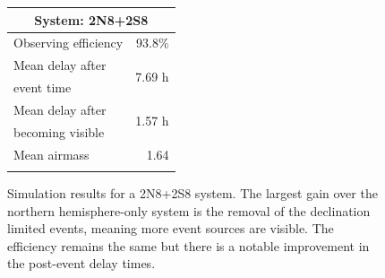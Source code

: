 \begin{colsection}
\begin{colsection}
\begin{figure}[p]
\begin{center}
\begin{minipage}[t]{0.35\textwidth}
\begin{tabular}{lr}
\multicolumn{2}{c}{\textbf{System: 2N8+2S8}} \\
\midrule
Observing efficiency & 93.8\% \\
\midrule
Mean delay after     & \multirow{2}{*}{7.69 h} \\
event time           & \\
Mean delay after     & \multirow{2}{*}{1.57 h} \\
becoming visible     & \\
\midrule
Mean airmass         & 1.64 \\
& \\
\end{tabular}
\vfill
\end{minipage}

\end{center}
\caption[Simulation results: 2N8+2S8 system]{Simulation results for a 2N8+2S8 system. The largest gain over the northern hemisphere-only system is the removal of the declination limited events, meaning more event sources are visible. The efficiency remains the same but there is a notable improvement in the post-event delay times.
}
\label{fig:sim_2n8+2s8}
\end{figure}


\begin{figure}[p]
\begin{center}


\end{center}
\end{figure}
\end{colsection}
\end{colsection}
